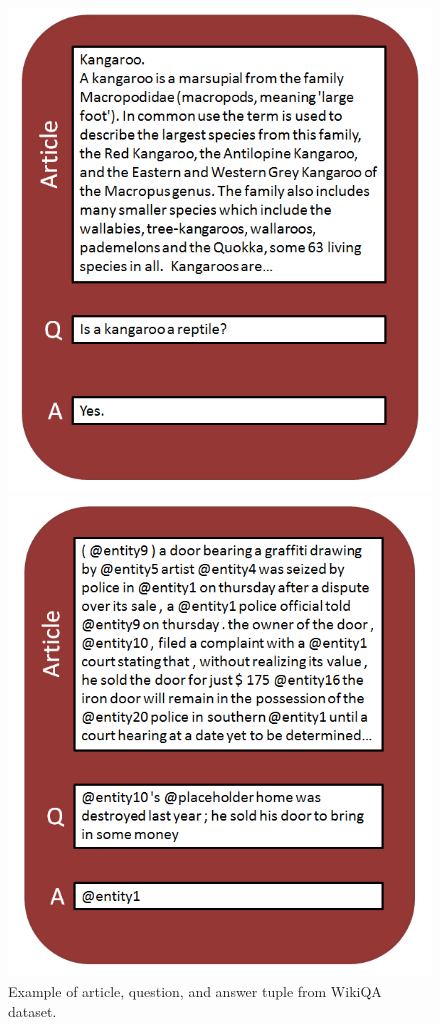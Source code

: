 \documentclass{article}
\begin{document}
\begin{figure}[ht]
	\begin{minipage}[b]{0.45\linewidth}
		\centering
		\includegraphics[width=\textwidth]{images/wikiqa}
		\caption{Example of article, question, and answer tuple from WikiQA dataset.  }
		\label{fig:wikiqa}
	\end{minipage}
	\hspace{0.5cm}
	\begin{minipage}[b]{0.45\linewidth}
		\centering
		\includegraphics[width=\textwidth]{images/google_cnn}

\end{minipage}
\end{figure}
\end{document}
